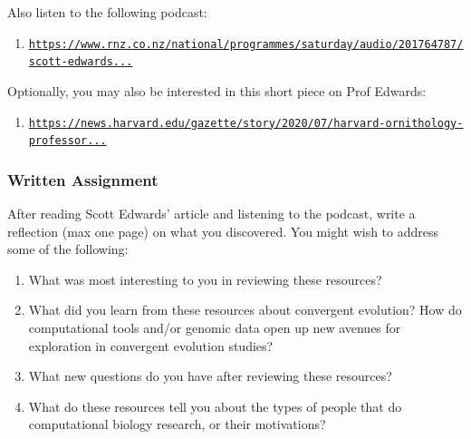 \documentclass{article}
\begin{document}
Also listen to the following podcast:
\begin{enumerate}
\item \texttt{\href{https://www.rnz.co.nz/national/programmes/saturday/audio/201764787/scott-edwards-birds-and-dinosaurs}{https://www.rnz.co.nz/national/programmes/saturday/audio/201764787/scott-edwards...}}
\end{enumerate}

Optionally, you may also be interested in this short piece on Prof Edwards:
\begin{enumerate}
\item \texttt{\href{https://news.harvard.edu/gazette/story/2020/07/harvard-ornithology-professor-bicycles-across-the-us/}{https://news.harvard.edu/gazette/story/2020/07/harvard-ornithology-professor...}}
\end{enumerate}


\subsubsection*{Written Assignment} 
After reading Scott Edwards' article and listening to the podcast, write a reflection (max one page) on what you discovered. You might wish to address some of the following: 

\begin{enumerate}
\item What was most interesting to you in reviewing these resources?
\item What did you learn from these resources about convergent evolution? How do computational tools and/or genomic data open up new avenues for exploration in convergent evolution studies?
\item What new questions do you have after reviewing these resources?
\item What do these resources tell you about the types of people that do computational biology research, or their motivations?
\end{enumerate}
\EndAccSupp{}
\end{document}
